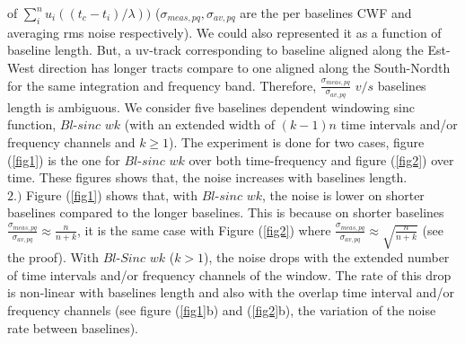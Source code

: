 \documentclass[useAMS,usenatbib]{mn2e}
\begin{document}
of $\sum_{i}^{n} u_i((t_c-t_i)/\lambda))$ ($\sigma_{meas,pq},\sigma_{av,pq}$ are the per baselines CWF and averaging rms noise  
respectively). We could also represented it as a function of baseline length. But, a uv-track corresponding to baseline aligned along the 
Est-West direction has longer tracts compare to one aligned along the South-Nordth for the same integration and frequency band. Therefore,  
$\frac{\sigma_{meas,pq}}{\sigma_{av,pq}}$ $v/s$ baselines length is ambiguous. We consider five baselines dependent 
windowing sinc function, $Bl$-$sinc$ $wk$ (with an extended width of $(k-1)n$ time intervals and/or frequency channels and $k \geq 1$). The 
experiment is done for two cases, figure (\ref{fig1}) is the one for $Bl$-$sinc$ $wk$ over both time-frequency and figure (\ref{fig2}) over 
time. These figures shows that, the noise increases with baselines length.\\

$2.)$ Figure (\ref{fig1}) shows that, with $Bl$-$sinc$ $wk$, the noise is lower on shorter baselines compared to the longer baselines. This 
is because on shorter  baselines  $\frac{\sigma_{meas,pq}}{\sigma_{av,pq}} \approx \frac{n}{n + k}$, it is the same case with 
Figure (\ref{fig2}) where $\frac{\sigma_{meas,pq}}{\sigma_{av,pq}} \approx \sqrt{\frac{n}{n + k}}$ (see the proof).  With $Bl$-$Sinc$ $wk$ 
($k>1$), the noise drops  with the extended number of time intervals and/or frequency channels of 
the window. The rate of this drop is non-linear with baselines length and also with the overlap time interval and/or frequency channels 
(see figure (\ref{fig1}b) and (\ref{fig2}b), the variation of the noise rate between baselines).  \\
\end{document}
